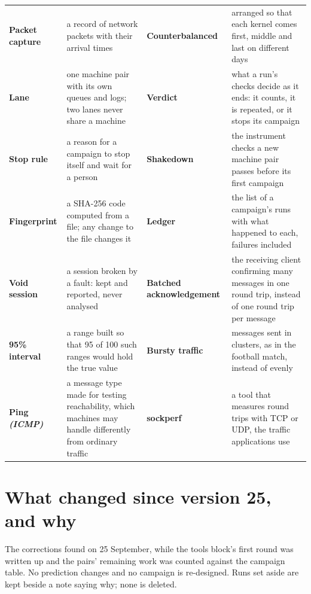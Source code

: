 \documentclass[11pt]{article}
\newcommand{\gl}[1]{{\color{soft}\itshape\small (#1)}}
\begin{document}
{\begin{tabularx}{\linewidth}{@{}>{\bfseries}p{3.1cm} X >{\bfseries}p{3.1cm} X@{}}
Packet capture & a record of network packets with their arrival times & Counterbalanced & arranged so that each kernel comes first, middle and last on different days \\
Lane & one machine pair with its own queues and logs; two lanes never share a machine & Verdict & what a run's checks decide as it ends: it counts, it is repeated, or it stops its campaign \\
Stop rule & a reason for a campaign to stop itself and wait for a person & Shakedown & the instrument checks a new machine pair passes before its first campaign \\
Fingerprint & a SHA-256 code computed from a file; any change to the file changes it & Ledger & the list of a campaign's runs with what happened to each, failures included \\
Void session & a session broken by a fault: kept and reported, never analysed & Batched acknowledgement & the receiving client confirming many messages in one round trip, instead of one round trip per message \\
95\% interval & a range built so that 95 of 100 such ranges would hold the true value & Bursty traffic & messages sent in clusters, as in the football match, instead of evenly \\
Ping \gl{ICMP} & a message type made for testing reachability, which machines may handle differently from ordinary traffic & sockperf & a tool that measures round trips with TCP or UDP, the traffic applications use \\
\end{tabularx}}

\section*{What changed since version 25, and why}
The corrections found on 25 September, while the tools block's first round was written up
and the pairs' remaining work was counted against the campaign table. No prediction changes and
no campaign is re-designed. Runs set aside are kept beside a note saying why; none is deleted.
\end{document}
